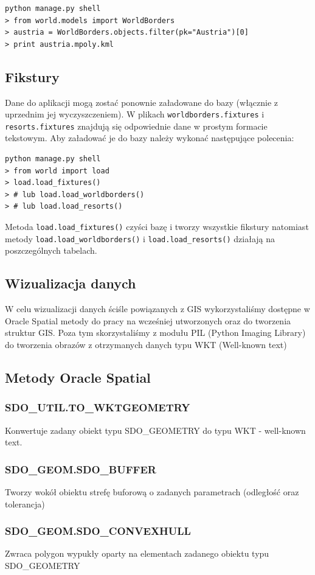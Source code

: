 \documentclass[12pt]{article}
\begin{document}
\begin{verbatim}
python manage.py shell
> from world.models import WorldBorders
> austria = WorldBorders.objects.filter(pk="Austria")[0]
> print austria.mpoly.kml
\end{verbatim}

\subsection{Fikstury}
Dane do aplikacji mogą zostać ponownie załadowane do bazy (włącznie z uprzednim jej wyczyszczeniem). W plikach
\texttt{worldborders.fixtures} i \texttt{resorts.fixtures} znajdują się odpowiednie dane w prostym formacie tekstowym.
Aby załadować je do bazy należy wykonać następujące polecenia:
\begin{verbatim}
python manage.py shell
> from world import load
> load.load_fixtures()
> # lub load.load_worldborders()
> # lub load.load_resorts()
\end{verbatim}
Metoda \texttt{load.load\_fixtures()} czyści bazę i tworzy wszystkie fikstury natomiast metody \texttt{load.load\_worldborders()}
i \texttt{load.load\_resorts()} działają na poszczególnych tabelach.

\subsection{Wizualizacja danych}
W celu wizualizacji danych ściśle powiązanych z GIS wykorzystaliśmy dostępne w Oracle Spatial metody do pracy na wcześniej utworzonych oraz do tworzenia struktur GIS. Poza tym skorzystaliśmy z modułu PIL (Python Imaging Library) do tworzenia obrazów z otrzymanych danych typu WKT (Well-known text)

\subsection{Metody Oracle Spatial}
\subsubsection{SDO\_UTIL.TO\_WKTGEOMETRY}
Konwertuje zadany obiekt typu SDO\_GEOMETRY do typu WKT - well-known text.
\subsubsection{SDO\_GEOM.SDO\_BUFFER}
Tworzy wokół obiektu strefę buforową o zadanych parametrach (odległość oraz tolerancja)
\subsubsection{SDO\_GEOM.SDO\_CONVEXHULL}
Zwraca polygon wypukły oparty na elementach zadanego obiektu typu SDO\_GEOMETRY
\end{document}
